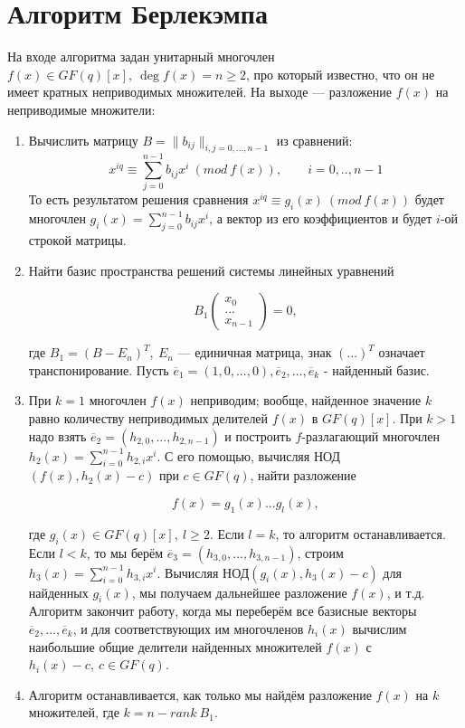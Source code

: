 \documentclass[12pt,a4paper]{scrartcl}
\begin{document}
	
\section{Алгоритм Берлекэмпа}

На входе алгоритма задан унитарный многочлен $f(x) \in GF(q)[x],\ \deg f(x)=n \geq 2$, про который известно, что он не имеет кратных неприводимых множителей. На выходе — разложение $f(x)$ на неприводимые множители:

\begin{enumerate}
	\item Вычислить матрицу $B=\|b_{ij}\|_{i,j=0,...,n-1}$ из сравнений:
	$$x^{iq}\equiv \sum_{j=0}^{n-1}b_{ij}x^i\ (mod\ f(x)),\qquad i=0,..,n-1$$
	То есть результатом решения сравнения $x^{iq}\equiv g_i(x)\ (mod\ f(x))$ будет многочлен $g_i(x)=\sum_{j=0}^{n-1}b_{ij}x^i$, а вектор из его коэффициентов и будет $i$-ой строкой матрицы.
	
	\item Найти базис пространства решений системы линейных уравнений
	
	$$B_1\begin{pmatrix}
		x_0\\
		...\\
		x_{n-1}
	\end{pmatrix}=0,$$
	
	где $B_1=(B-E_n)^T,\ E_n$ — единичная матрица, знак $(...)^T$ означает транспонирование. Пусть $\overline{e}_1=(1, 0,...,0),\overline{e}_2,...,\overline{e}_k$ - найденный базис.
	
	\item При $k=1$ многочлен $f(x)$ неприводим; вообще, найденное значение $k$ равно количеству неприводимых делителей $f(x)$ в $GF(q)[x]$. При $k>1$ надо взять $\overline{e}_2=(h_{2,0},...,h_{2,n-1})$ и построить $f$-разлагающий многочлен $h_2(x)=\sum_{i=0}^{n-1}h_{2,i}x^i$. С его помощью, вычисляя НОД$(f(x),h_2(x)-c)$ при $c \in GF(q)$, найти разложение 
	
	$$f(x)=g_1(x)...g_l(x),$$
	
	где $g_i(x) \in GF(q)[x],\ l \geq 2$. Если $l=k$, то алгоритм останавливается. Если $l<k$, то мы берём $\overline{e}_3=(h_{3,0},...,h_{3,n-1})$, строим $h_3(x)=\sum_{i=0}^{n-1}h_{3,i}x^i$. Вычисляя НОД$(g_i(x),h_3(x)-c)$ для найденных $g_i(x)$, мы получаем дальнейшее разложение $f(x)$, и т.д. Алгоритм закончит работу, когда мы переберём все базисные векторы $\overline{e}_2,...,\overline{e}_k$, и для соответствующих им многочленов $h_i(x)$ вычислим наибольшие общие делители найденных множителей $f(x)$ с $h_i(x)-c,\ c \in GF(q)$.
	
	\item Алгоритм останавливается, как только мы найдём разложение $f(x)$ на $k$ множителей, где $k=n - rank\ B_1$.
	
\end{enumerate}
\end{document}
